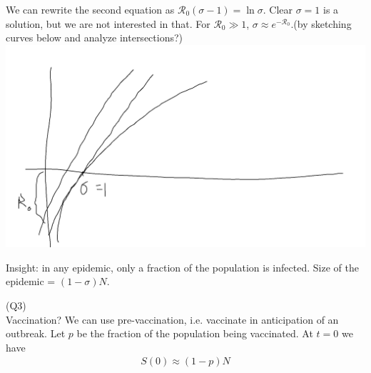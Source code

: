 \documentclass[a4paper]{article}
\begin{document}
We can rewrite the second equation as $\mathcal{R}_0 (\sigma-1) = \ln \sigma$. Clear $\sigma = 1$ is a solution, but we are not interested in that. For $\mathcal{R}_0 \gg 1$, $\sigma \approx e^{-\mathcal{R}_0}$.(by sketching curves below and analyze intersections?)
\includegraphics[scale=0.5]{image/Bio_08.png}

Insight: in any epidemic, only a fraction of the population is infected. Size of the epidemic = $(1-\sigma)N$.

(Q3)\\
Vaccination? We can use pre-vaccination, i.e. vaccinate in anticipation of an outbreak. Let $p$ be the fraction of the population being vaccinated. At $t=0$ we have
\begin{equation*}
\begin{aligned}
S(0) \approx (1-p)N
\end{aligned}
\end{equation*}

\end{document}
